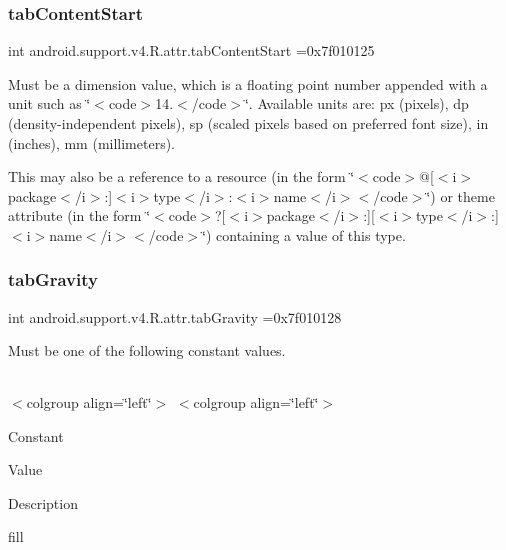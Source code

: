 \subsubsection{\texorpdfstring{tab\+Content\+Start}{tabContentStart}}
{\footnotesize\ttfamily int android.\+support.\+v4.\+R.\+attr.\+tab\+Content\+Start =0x7f010125\hspace{0.3cm}{\ttfamily [static]}}

Must be a dimension value, which is a floating point number appended with a unit such as \char`\"{}$<$code$>$14.\+5sp$<$/code$>$\char`\"{}. Available units are\+: px (pixels), dp (density-\/independent pixels), sp (scaled pixels based on preferred font size), in (inches), mm (millimeters). 

This may also be a reference to a resource (in the form \char`\"{}$<$code$>$@\mbox{[}$<$i$>$package$<$/i$>$\+:\mbox{]}$<$i$>$type$<$/i$>$\+:$<$i$>$name$<$/i$>$$<$/code$>$\char`\"{}) or theme attribute (in the form \char`\"{}$<$code$>$?\mbox{[}$<$i$>$package$<$/i$>$\+:\mbox{]}\mbox{[}$<$i$>$type$<$/i$>$\+:\mbox{]}$<$i$>$name$<$/i$>$$<$/code$>$\char`\"{}) containing a value of this type. \mbox{\label{classandroid_1_1support_1_1v4_1_1R_1_1attr_a97c428cfd4a88c1bf6fe855469390abe}} 
\subsubsection{\texorpdfstring{tab\+Gravity}{tabGravity}}
{\footnotesize\ttfamily int android.\+support.\+v4.\+R.\+attr.\+tab\+Gravity =0x7f010128\hspace{0.3cm}{\ttfamily [static]}}

Must be one of the following constant values.

\tabulinesep=1mm
\begin{longtabu} spread 0pt [c]{*{0}{|X[-1]}|}
\hline
\end{longtabu}
$<$colgroup align=\char`\"{}left\char`\"{}$>$ $<$colgroup align=\char`\"{}left\char`\"{}$>$ 

Constant

Value

Description 

{\ttfamily fill}

